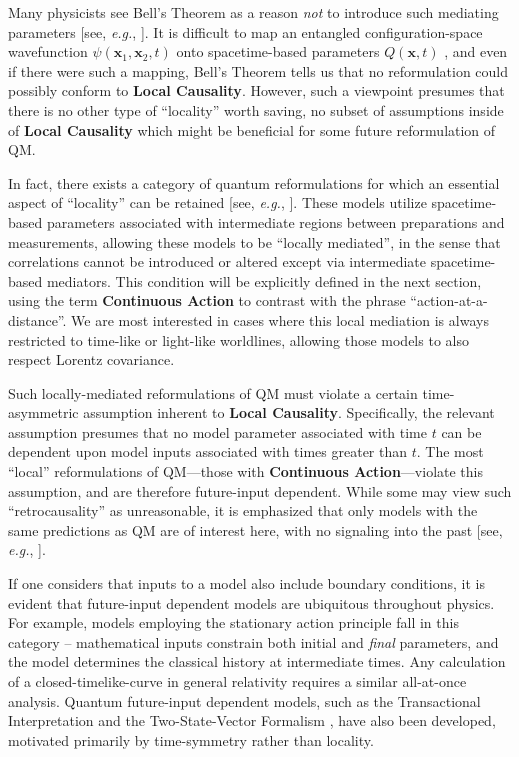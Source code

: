 \documentclass[rmp, aps, preprint, longbibliography]{revtex4-1}
\begin{document}
Many physicists see Bell's Theorem as a reason {\em not} to introduce such mediating parameters [see, \emph{e.g.}, \textcite{mermin1986}].  It is difficult to map an entangled configuration-space wavefunction $\psi(\bm{x}_1,\bm{x}_2,t)$ onto spacetime-based parameters $Q(\bm{x},t)$ \cite{norsen2010,stoica2019}, and even if there were such a mapping,
Bell's Theorem tells us that no reformulation could possibly conform to {\bf Local Causality}.  However, such a viewpoint presumes that there is no other type of ``locality'' worth saving, no subset of assumptions inside of {\bf Local Causality} which might be beneficial for some future reformulation of QM.  

In fact, there exists a category of quantum reformulations for which an essential aspect of ``locality'' can be retained [see, \emph{e.g.}, \textcite{costa1953,price1997,argaman2010}].  These models utilize spacetime-based parameters associated with intermediate regions between preparations and measurements, allowing these models to be ``locally mediated'', in the sense that correlations cannot be introduced or altered except via intermediate spacetime-based mediators.  This condition will be explicitly defined in the next section, using the term {\bf Continuous Action} to contrast with the phrase ``action-at-a-distance''.  We are most interested in cases where this local mediation is always restricted to time-like or light-like worldlines, allowing those models to also respect Lorentz covariance.  

Such locally-mediated reformulations of QM must violate a certain time-asymmetric assumption inherent to {\bf Local Causality}.  Specifically, the relevant assumption presumes that no model parameter associated with time $t$ can be dependent upon model inputs associated with times greater than $t$.  The most ``local'' reformulations of QM---those with {\bf Continuous Action}---violate this assumption, and are therefore future-input dependent.  While some may view such ``retrocausality'' as unreasonable, it is emphasized that only models with the same predictions as QM are of interest here, with no signaling into the past [see, \emph{e.g.}, \textcite{price1997}].  

If one considers that inputs to a model also include boundary conditions, it is evident that future-input dependent models are ubiquitous throughout physics.  For example, models employing the stationary action principle fall in this category -- mathematical inputs constrain both initial and \emph{final} parameters, and the model determines the classical history at intermediate times.  Any calculation of a closed-timelike-curve in general relativity requires a similar all-at-once analysis.  Quantum future-input dependent models, such as the Transactional Interpretation \cite{cramer1980} and the Two-State-Vector Formalism \cite{aharonov1991}, have also been developed, motivated primarily by time-symmetry rather than locality.
\end{document}

